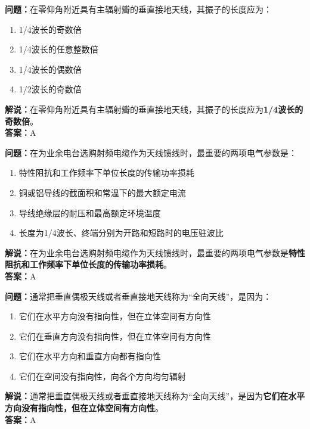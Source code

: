 \textbf{问题：}在零仰角附近具有主辐射瓣的垂直接地天线，其振子的长度应为：

\begin{enumerate}[label=\Alph*), leftmargin=1.5cm]
	\item 1/4波长的奇数倍
	\item 1/4波长的任意整数倍
	\item 1/4波长的偶数倍
	\item 1/2波长的奇数倍
\end{enumerate}

\textbf{解说：}在零仰角附近具有主辐射瓣的垂直接地天线，其振子的长度应为\textbf{1/4波长的奇数倍}。\\\textbf{答案：}A%



\textbf{问题：}在为业余电台选购射频电缆作为天线馈线时，最重要的两项电气参数是：

\begin{enumerate}[label=\Alph*), leftmargin=1.5cm]
	\item 特性阻抗和工作频率下单位长度的传输功率损耗
	\item 铜或铝导线的截面积和常温下的最大额定电流
	\item 导线绝缘层的耐压和最高额定环境温度
	\item 长度为1/4波长、终端分别为开路和短路时的电压驻波比
\end{enumerate}

\textbf{解说：}在为业余电台选购射频电缆作为天线馈线时，最重要的两项电气参数是\textbf{特性阻抗和工作频率下单位长度的传输功率损耗}。\\\textbf{答案：}A%



\textbf{问题：}通常把垂直偶极天线或者垂直接地天线称为“全向天线”，是因为：

\begin{enumerate}[label=\Alph*), leftmargin=1.5cm]
	\item 它们在水平方向没有指向性，但在立体空间有方向性
	\item 它们在垂直方向没有指向性，但在立体空间有方向性
	\item 它们在水平方向和垂直方向都有指向性
	\item 它们在空间没有指向性，向各个方向均匀辐射
\end{enumerate}

\textbf{解说：}通常把垂直偶极天线或者垂直接地天线称为“全向天线”，是因为\textbf{它们在水平方向没有指向性，但在立体空间有方向性}。\\\textbf{答案：}A%



